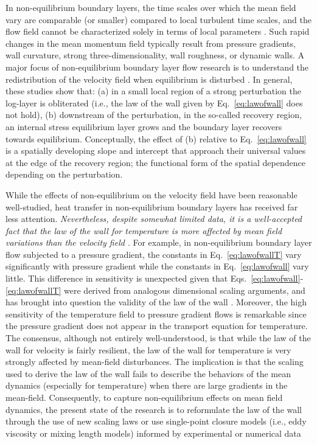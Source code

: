 In non-equilibrium boundary layers, the time scales over which the mean field vary are comparable (or smaller) compared to local turbulent time scales, and the flow field cannot be characterized solely in terms of local parameters \cite{townsend1976}. Such rapid changes in the mean momentum field typically result from pressure gradients, wall curvature, strong three-dimensionality, wall roughness, or dynamic walls. A major focus of non-equilibrium boundary layer flow research is to understand the redistribution of the velocity field when equilibrium is disturbed \cite{Antonia1977, Bradshaw1972a, Bandyopadhyay1993, Castro1998}. In general, these studies show that: (a) in a small local region of a strong perturbation the log-layer is obliterated (i.e.,  the law of the wall given by Eq.~\ref{eq:lawofwall} does not hold), (b) downstream of the perturbation, in the so-called recovery region, an internal stress equilibrium layer grows and the boundary layer recovers towards equilibrium. Conceptually, the effect of (b) relative to Eq.~\ref{eq:lawofwall} is a spatially developing slope and intercept that approach their universal values at the edge of the recovery region; the functional form of the spatial dependence depending on the perturbation. 

While the effects of non-equilibrium on the velocity field have been reasonable well-studied, heat transfer in non-equilibrium boundary layers has received far less attention. \emph{Nevertheless, despite somewhat limited data, it is a well-accepted fact that the law of the wall for temperature is more affected by mean field variations than the velocity field \cite{Blackwell_1972, Kader1991, Bradshaw1995, Kong2001, Houra2006, Wang2008}}. For example, in non-equilibrium boundary layer flow subjected to a pressure gradient, the constants in Eq.~\ref{eq:lawofwallT} vary significantly with pressure gradient while the constants in Eq.~\ref{eq:lawofwall} vary little. This difference in sensitivity is unexpected given that Eqs.~\ref{eq:lawofwall}-\ref{eq:lawofwallT} were derived from analogous dimensional scaling arguments, and has brought into question the validity of the law of the wall \cite{Bradshaw1995}. Moreover, the high sensitivity of the temperature field to pressure gradient flows is remarkable since the pressure gradient does not appear in the transport equation for temperature. The consensus, although not entirely well-understood, is that while the law of the wall for velocity is fairly resilient, the law of the wall for temperature is very strongly affected by mean-field disturbances. The implication is that the scaling used to derive the law of the wall fails to describe the behaviors of the mean dynamics (especially for temperature) when there are large gradients in the mean-field. Consequently, to capture non-equilibrium effects on mean field dynamics, the present state of the research is to reformulate the law of the wall through the use of new scaling laws \cite{Durbin1992, George1993, Cruz1998, Cruz2002, Wang2008} or use single-point closure models (i.e., eddy viscosity or mixing length models) informed by experimental or numerical data \cite{Cebeci1988} %

